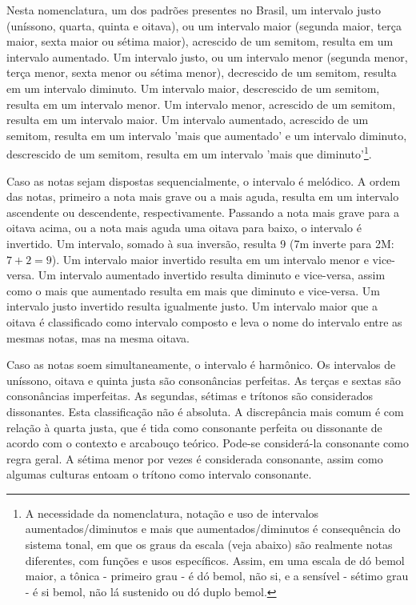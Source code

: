Nesta nomenclatura, um dos padrões presentes no Brasil,
um intervalo justo (uníssono, quarta, quinta e oitava), ou um intervalo maior (segunda maior, terça maior, sexta maior ou sétima maior), acrescido de um semitom, resulta em um intervalo aumentado. Um intervalo justo, ou um intervalo menor (segunda menor, terça menor, sexta menor ou sétima menor), decrescido de um semitom, resulta em um intervalo diminuto. Um intervalo maior, descrescido de um semitom,
resulta em um intervalo menor. Um intervalo menor, acrescido de um semitom, resulta em um intervalo maior. Um intervalo aumentado, acrescido de um semitom, resulta em um intervalo 'mais que aumentado' e um intervalo diminuto, descrescido de um semitom, resulta em um intervalo 'mais que diminuto'\footnote{A
 necessidade da nomenclatura, notação e uso de intervalos aumentados/diminutos e mais que aumentados/diminutos é consequência do sistema tonal, em que os graus da escala (veja abaixo) são realmente notas diferentes, com funções e usos específicos. Assim, em uma escala de dó bemol maior, a tônica - primeiro grau - é dó bemol, não si, e a sensível - sétimo grau - é si bemol, não lá sustenido ou dó duplo bemol.}.\cite{Lacerda} 

Caso as notas sejam dispostas sequencialmente, o intervalo é melódico. A ordem das notas, primeiro a nota mais grave ou a mais aguda, resulta em um intervalo ascendente ou descendente, respectivamente. 
Passando a nota mais grave para a oitava acima, ou a nota mais aguda uma oitava para baixo, o intervalo é invertido. Um intervalo, somado à sua inversão, resulta 9 (7m inverte para 2M: $7+2=9$). Um intervalo maior invertido resulta em um intervalo menor e vice-versa. Um intervalo aumentado invertido resulta diminuto e vice-versa, assim como o mais que aumentado resulta em mais que diminuto e vice-versa. Um intervalo justo invertido resulta igualmente justo.
Um intervalo maior que a oitava é classificado como intervalo composto e leva o nome do intervalo entre as mesmas notas, mas na mesma oitava.

Caso as notas soem simultaneamente, o intervalo é harmônico. Os intervalos de uníssono, oitava e quinta justa são consonâncias perfeitas. As terças e sextas são consonâncias imperfeitas. As segundas, sétimas e trítonos são considerados dissonantes. Esta classificação não é absoluta. A discrepância mais comum é com relação à quarta justa, que é tida como consonante perfeita ou dissonante de acordo com o contexto e arcabouço teórico. Pode-se considerá-la consonante como regra geral. A sétima menor por vezes é considerada consonante, assim como algumas culturas entoam o trítono como intervalo consonante.\cite{Roederer,Wisnick}

